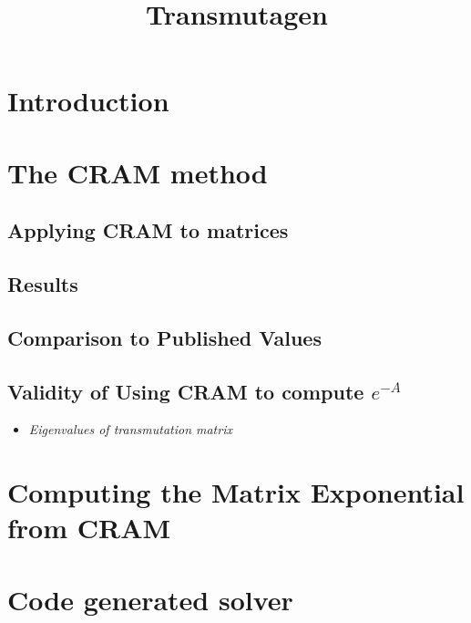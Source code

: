 \documentclass{article}
\title{Transmutagen}
\begin{document}
\flushbottom
\maketitle
\thispagestyle{empty}

\begin{abstract}

\end{abstract}


\section{Introduction}
\label{sec:intro}


\section{The CRAM method}
\label{sec:cram-method}


\subsection{Applying CRAM to matrices}
\label{sec:cram-matrices}


\subsection{Results}
\label{sec:cram-results}


\subsection{Comparison to Published Values}
\subsection{Validity of Using CRAM to compute $e^{-A}$}
\begin{itemize}
\item \it{Eigenvalues of transmutation matrix}
\end{itemize}

\section{Computing the Matrix Exponential from CRAM}
\label{sec:matrix-cram}


\section{Code generated solver}
\end{document}
